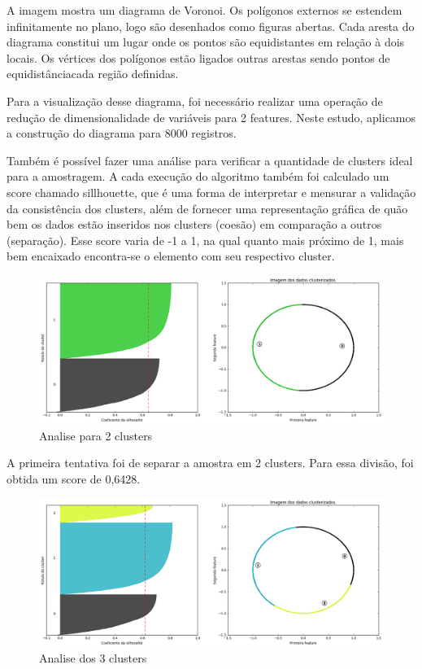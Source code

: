 A imagem mostra um diagrama de Voronoi. Os polígonos externos se estendem infinitamente no plano, logo são desenhados como figuras abertas. Cada aresta do diagrama constitui um lugar onde os pontos são equidistantes em relação à dois locais. Os vértices dos polígonos estão ligados outras arestas sendo pontos de equidistânciacada região definidas.

Para a visualização desse diagrama, foi necessário realizar uma operação de redução de dimensionalidade de variáveis para 2 features. Neste estudo, aplicamos a construção do diagrama para 8000 registros.

Também é possível fazer uma análise para verificar a quantidade de clusters ideal para a amostragem. A cada execução do algoritmo também foi calculado um score chamado sillhouette, que é uma forma de interpretar e mensurar a validação da consistência dos clusters, além de fornecer uma representação gráfica de quão bem os dados estão inseridos nos clusters (coesão) em comparação a outros (separação). Esse score varia de -1 a 1, na qual quanto mais próximo de 1, mais bem encaixado encontra-se o elemento com seu respectivo cluster.

\begin{figure}[!ht]
\caption{Analise para 2 clusters }
\centerline{\includegraphics[width=.85\textwidth]{img/silhoute2}}
\end{figure}

A primeira tentativa foi de separar a amostra em 2 clusters. Para essa divisão, foi obtida um score de 0,6428.


\begin{figure}[!ht]
\caption{Analise dos 3 clusters }
\centerline{\includegraphics[width=.85\textwidth]{img/silhoute3}}
\end{figure}

